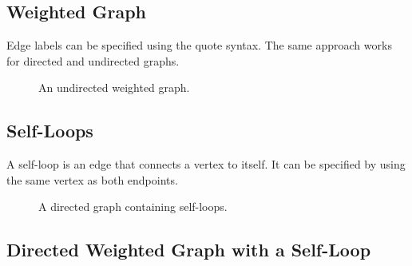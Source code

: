 \documentclass{csdept}
\begin{document}
\subsection{Weighted Graph}

Edge labels can be specified using the quote syntax.
The same approach works for directed and undirected graphs.

\begin{figure}[htbp]
    \centering


    \caption{An undirected weighted graph.}
    \label{fig:weighted-graph}
\end{figure}

\subsection{Self-Loops}

A self-loop is an edge that connects a vertex to itself.
It can be specified by using the same vertex as both endpoints.

\begin{figure}[htbp]
    \centering


    \caption{A directed graph containing self-loops.}
    \label{fig:self-loops}
\end{figure}

\subsection{Directed Weighted Graph with a Self-Loop}
\end{document}
